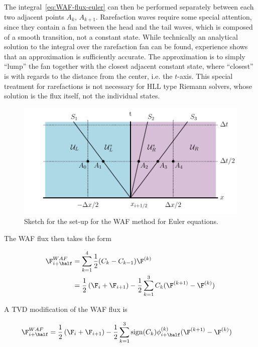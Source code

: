 The integral~\ref{eq:WAF-flux-euler} can then be performed separately between each two adjacent
points $A_k$, $A_{k+1}$. Rarefaction waves require some special attention, since they contain a
fan between the head and the tail waves, which is composed of a smooth transition, not a constant
state. While technically an analytical solution to the integral over the rarefaction fan can be
found, experience shows that an approximation is sufficiently accurate. The approximation is to
simply ``lump'' the fan together with the closest adjacent constant state, where ``closest'' is
with regards to the distance from the center, i.e. the $t$-axis. This special treatment for
rarefactions is not necessary for HLL type Riemann solvers, whose solution is the flux itself, not
the individual states.



\begin{figure}
    \centering
    \includegraphics[width=.8\linewidth]{figures/FV/WAF-hydro.pdf}
    \caption[Setup for the WAF method for Euler equations]{
        Sketch for the set-up for the WAF method for Euler equations.
    }%
    \label{fig:hydro-WAF-setup}
\end{figure}


The WAF flux then takes the form

\begin{align}
    \F_{i+\half}^{WAF} &= \sum_{k=1}^4 \frac{1}{2} (C_k - C_{k-1}) \F^{(k)} \\
    &= \frac{1}{2} \left( \F_i + \F_{i+1} \right) -
    \frac{1}{2} \sum_{k=1}^3 C_k (\F^{(k+1)} - \F^{(k)})
\end{align}


A TVD modification of the WAF flux is

\begin{align}
    \F_{i+\half}^{WAF} &=
        \frac{1}{2} \left( \F_i + \F_{i+1} \right) -
        \frac{1}{2} \sum_{k=1}^3 \mathrm{sign}(C_k) \phi_{i+\half}^{(k)} (\F^{(k+1)} - \F^{(k)})
\end{align}

